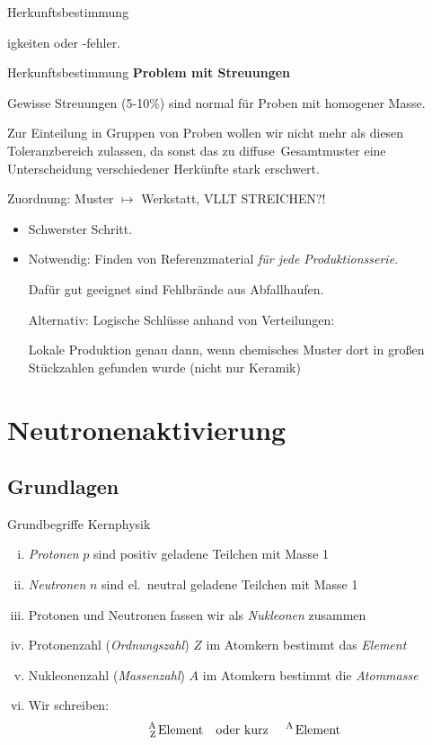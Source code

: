 \documentclass[xcolor=dvipsnames, aspectratio=169]{beamer}
\begin{document}
\begin{frame}{Herkunftsbestimmung}
\begin{itemize}[<+->]
igkeiten oder -fehler.
\end{itemize}
\end{frame}

\begin{frame}{Herkunftsbestimmung}
\textbf{Problem mit Streuungen}

Gewisse Streuungen (5-10\%) sind normal für Proben mit homogener Masse.

Zur Einteilung in Gruppen von Proben wollen wir nicht mehr als diesen Toleranzbereich zulassen, da sonst das zu \glqq diffuse\grqq\ Gesamtmuster eine Unterscheidung verschiedener Herkünfte stark erschwert.
\end{frame}

\begin{frame}{Zuordnung: Muster $\mapsto$ Werkstatt, VLLT STREICHEN?!}
\begin{itemize}
\item Schwerster Schritt.
\item Notwendig: Finden von Referenzmaterial \textit{für jede Produktionsserie}.

Dafür gut geeignet sind \alert{Fehlbrände} aus Abfallhaufen.\medskip\pause

Alternativ: Logische Schlüsse anhand von \alert{Verteilungen}:

Lokale Produktion genau dann, wenn chemisches Muster dort in großen Stückzahlen gefunden wurde (nicht nur Keramik)
\end{itemize}
\end{frame}

\section{Neutronenaktivierung}

\subsection{Grundlagen}\printSectionYes
\begin{frame}[<+->]{Grundbegriffe Kernphysik}
\begin{enumerate}[(i)]
\item \emph{Protonen} $p$ sind positiv geladene Teilchen mit Masse 1
\item \emph{Neutronen} $n$ sind el.\ neutral geladene Teilchen mit Masse 1
\item Protonen und Neutronen fassen wir als \emph{Nukleonen} zusammen
\item Protonenzahl (\emph{Ordnungszahl}) $Z$ im Atomkern bestimmt das \emph{Element}
\item Nukleonenzahl (\emph{Massenzahl}) $A$ im Atomkern bestimmt die \emph{Atommasse}
\item Wir schreiben: \[\text{\ce{^A_Z Element}\quad oder kurz \quad\ce{^A Element}}\]
\end{enumerate}
\end{frame}
\end{document}
